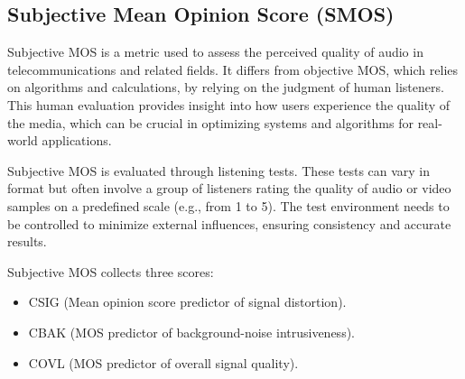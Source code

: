 \subsection{Subjective Mean Opinion Score (SMOS)}
Subjective MOS is a metric used to assess the perceived quality of audio in telecommunications and related fields. It differs from objective MOS, which relies on algorithms and calculations, by relying on the judgment of human listeners. This human evaluation provides insight into how users experience the quality of the media, which can be crucial in optimizing systems and algorithms for real-world applications.

Subjective MOS is evaluated through listening tests. These tests can vary in format but often involve a group of listeners rating the quality of audio or video samples on a predefined scale (e.g., from 1 to 5). The test environment needs to be controlled to minimize external influences, ensuring consistency and accurate results.

Subjective MOS collects three scores:

\begin{itemize}
    \item CSIG (Mean opinion score predictor of signal distortion).
    \item CBAK (MOS predictor of background-noise intrusiveness).
    \item COVL (MOS predictor of overall signal quality).
\end{itemize}

\endgroup